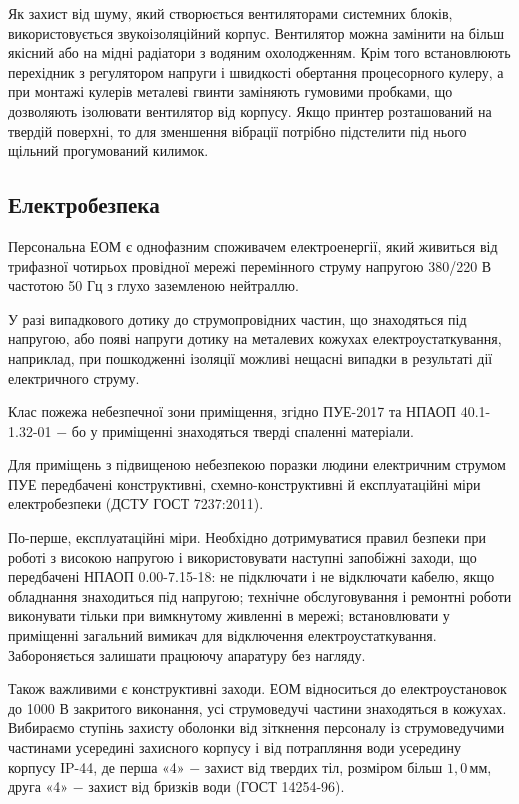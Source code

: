 Як захист від шуму, який створюється вентиляторами системних блоків, використовується звукоізоляційний корпус. Вентилятор можна замінити на більш якісний або на мідні радіатори з водяним охолодженням. Крім того встановлюють перехідник з регулятором напруги і швидкості обертання процесорного кулеру, а при монтажі кулерів металеві гвинти заміняють гумовими пробками, що дозволяють ізолювати вентилятор від корпусу. Якщо принтер розташований на твердій поверхні, то для зменшення вібрації потрібно підстелити під нього щільний прогумований килимок.

\vspace{1.5em}

\subsection{Електробезпека}

Персональна ЕОМ є однофазним споживачем електроенергії, який живиться від трифазної чотирьох провідної мережі перемінного струму напругою 380/220 В частотою 50 Гц з глухо заземленою нейтраллю.

У разі випадкового дотику до струмопровідних частин, що знаходяться під напругою, або появі напруги дотику на металевих кожухах електроустаткування, наприклад, при пошкодженні ізоляції можливі нещасні випадки в результаті дії електричного струму.

Клас пожежа небезпечної зони приміщення, згідно ПУЕ-2017 та НПАОП 40.1-1.32-01 $-$ бо у приміщенні знаходяться тверді спаленні матеріали. 

Для приміщень з підвищеною небезпекою поразки людини електричним струмом ПУЕ передбачені конструктивні, схемно-конструктивні й експлуатаційні міри електробезпеки (ДСТУ ГОСТ 7237:2011).

	По-перше, експлуатаційні міри. Необхідно дотримуватися правил безпеки при роботі з високою напругою і використовувати наступні запобіжні заходи, що передбачені НПАОП 0.00-7.15-18: не підключати і не відключати кабелю, якщо обладнання знаходиться під напругою; технічне обслуговування і ремонтні роботи виконувати тільки при вимкнутому живленні в мережі; встановлювати у приміщенні загальний вимикач для відключення електроустаткування. Забороняється залишати працюючу апаратуру без нагляду.

	Також важливими є конструктивні заходи. ЕОМ відноситься до електроустановок до 1000 В закритого виконання, усі струмоведучі частини знаходяться в кожухах. Вибираємо ступінь захисту оболонки від зіткнення персоналу із струмоведучими частинами усередині захисного корпусу і від потрапляння води усередину корпусу ІP-44, де перша «4» $-$ захист від твердих тіл, розміром більш $1,0 \, \text{мм}$, друга «4» $-$ захист від бризків води (ГОСТ 14254-96).

